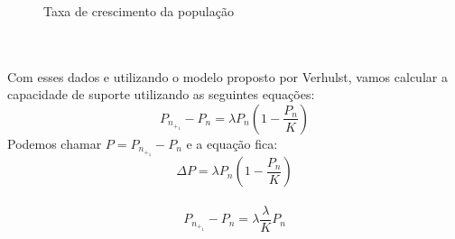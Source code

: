 \documentclass[a4paper]{article}
\begin{document}
\begin{figure}[h]
\label{fig_tax_cresc}
\caption{Taxa de crescimento da popula\c{c}\~{a}o}
{}
\end{figure}
\\
\\
Com esses dados e utilizando o modelo proposto por Verhulst, vamos calcular a capacidade de suporte utilizando as seguintes equa\c{c}\~{o}es:
\begin{equation}
P_n_+_1 - P_n = \lambda P_n(1 - \frac{P_n}{K})
\end{equation}
Podemos chamar \Delta $P = P_n_+_1 - P_n$ e a equa\c{c}\~{a}o fica:
\begin{equation}
\Delta P  = \lambda P_n(1 - \frac{P_n}{K})
\end{equation}
\\
\begin{equation}
P_n_+_1 - P_n = \lambda  \frac{\lambda}{K}P_n
\end{equation}
\end{document}
